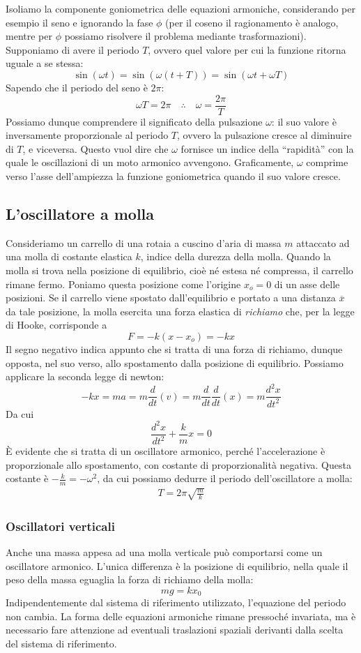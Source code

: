 Isoliamo la componente goniometrica delle equazioni armoniche, considerando
per esempio il seno e ignorando la fase $\phi$ (per il coseno il ragionamento
è analogo, mentre per $\phi$ possiamo risolvere il problema mediante trasformazioni).
Supponiamo di avere il periodo $T$, ovvero quel valore per cui la funzione ritorna
uguale a se stessa:
\[ \sin(\omega t) = \sin(\omega(t + T)) = \sin(\omega t + \omega T) \]
Sapendo che il periodo del seno è $2\pi$:
\[ \omega T = 2\pi \quad \therefore \quad \omega = \frac{2\pi}{T} \]
Possiamo dunque comprendere il significato della pulsazione $\omega$:
il suo valore è inversamente proporzionale al periodo $T$, ovvero la
pulsazione cresce al diminuire di $T$, e viceversa. Questo vuol dire
che $\omega$ fornisce un indice della ``rapidità'' con la quale le
oscillazioni di un moto armonico avvengono. Graficamente, $\omega$
comprime verso l'asse dell'ampiezza la funzione goniometrica quando il suo
valore cresce.

\subsection{L'oscillatore a molla}
Consideriamo un carrello di una rotaia a cuscino d'aria di massa $m$ attaccato
ad una molla di costante elastica $k$, indice della durezza della molla. Quando la molla si trova nella
posizione di equilibrio, cioè né estesa né compressa, il carrello rimane
fermo. Poniamo questa posizione come l'origine $x_o = 0$ di un asse delle
posizioni. Se il carrello viene spostato dall'equilibrio e portato a una
distanza $\overline{x}$ da tale posizione, la molla esercita una forza
elastica di \textit{richiamo} che, per la legge di Hooke, corrisponde a
\[ F = -k(x - x_o) = -kx \]
Il segno negativo indica appunto che si tratta di una forza di richiamo,
dunque opposta, nel suo verso, allo spostamento dalla posizione di equilibrio.
Possiamo applicare la seconda legge di newton:
\[ -kx = ma = m\frac{d}{dt}(v) = m\frac{d}{dt}\frac{d}{dt}(x) = m\frac{d^2x}{dt^2} \]
Da cui
\[ \frac{d^2x}{dt^2} + \frac{k}{m}x = 0 \]
È evidente che si tratta di un oscillatore armonico, perché l'accelerazione
è proporzionale allo spostamento, con costante di proporzionalità negativa.
Questa costante è $-\frac{k}{m} = -\omega^2$, da cui possiamo dedurre il
periodo dell'oscillatore a molla:
\begin{align}
    T = 2\pi\sqrt{\frac{m}{k}}\label{periodomolla}
\end{align}

\subsubsection*{Oscillatori verticali}
Anche una massa appesa ad una molla verticale può comportarsi come un
oscillatore armonico. L'unica differenza è la posizione di equilibrio,
nella quale il peso della massa eguaglia la forza di richiamo della
molla:
\[ mg = kx_0 \]
Indipendentemente dal sistema di riferimento utilizzato, l'equazione del
periodo non cambia. La forma delle equazioni armoniche rimane pressoché
invariata, ma è necessario fare attenzione ad eventuali traslazioni spaziali
derivanti dalla scelta del sistema di riferimento.

